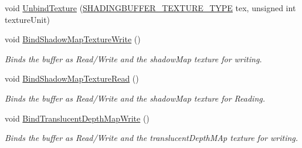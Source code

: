 \begin{DoxyCompactItemize}
\item 
void \mbox{\hyperlink{class_geometry_engine_1_1_geometry_buffer_1_1_shading_buffer_ad80b99462f09f88f2937542b72d909f9}{Unbind\+Texture}} (\mbox{\hyperlink{class_geometry_engine_1_1_geometry_buffer_1_1_shading_buffer_a8047a079ff9fb9fa3400651664c92ae9}{S\+H\+A\+D\+I\+N\+G\+B\+U\+F\+F\+E\+R\+\_\+\+T\+E\+X\+T\+U\+R\+E\+\_\+\+T\+Y\+PE}} tex, unsigned int texture\+Unit)
\item 
\mbox{\label{class_geometry_engine_1_1_geometry_buffer_1_1_shading_buffer_a4f1c4f4a0638ebb9572ee8562192e279}} 
void \mbox{\hyperlink{class_geometry_engine_1_1_geometry_buffer_1_1_shading_buffer_a4f1c4f4a0638ebb9572ee8562192e279}{Bind\+Shadow\+Map\+Texture\+Write}} ()
\begin{DoxyCompactList}\small\item\em Binds the buffer as Read/\+Write and the shadow\+Map texture for writing. \end{DoxyCompactList}\item 
\mbox{\label{class_geometry_engine_1_1_geometry_buffer_1_1_shading_buffer_aa34e7d2ba972f96eb6da9bdbd07e4245}} 
void \mbox{\hyperlink{class_geometry_engine_1_1_geometry_buffer_1_1_shading_buffer_aa34e7d2ba972f96eb6da9bdbd07e4245}{Bind\+Shadow\+Map\+Texture\+Read}} ()
\begin{DoxyCompactList}\small\item\em Binds the buffer as Read/\+Write and the shadow\+Map texture for Reading. \end{DoxyCompactList}\item 
\mbox{\label{class_geometry_engine_1_1_geometry_buffer_1_1_shading_buffer_a25f370a575c43a131fcdbe25aab9b3f1}} 
void \mbox{\hyperlink{class_geometry_engine_1_1_geometry_buffer_1_1_shading_buffer_a25f370a575c43a131fcdbe25aab9b3f1}{Bind\+Translucent\+Depth\+Map\+Write}} ()
\begin{DoxyCompactList}\small\item\em Binds the buffer as Read/\+Write and the translucent\+Depth\+M\+Ap texture for writing. \end{DoxyCompactList}\item 
\mbox{\label{class_geometry_engine_1_1_geometry_buffer_1_1_shading_buffer_a9ee3f5301379da20df2a2550c44c9576}} 

\end{DoxyCompactItemize}
